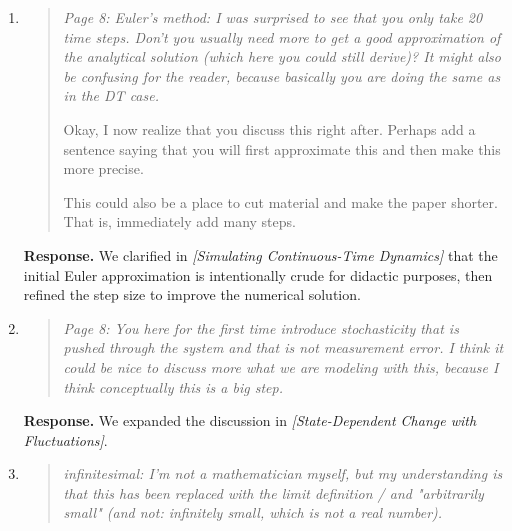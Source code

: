\documentclass[11pt]{article}
\newcommand{\response}{\textbf{Response.} }
\newcommand{\secit}[1]{\textit{[#1]}}
\newenvironment{reviewerpoint}{\begin{quote}\itshape}{\end{quote}}
\begin{document}
\begin{enumerate}[label=\textbf{Reviewer 1, Minor Point \arabic*.}]
\begin{reviewerpoint}
Page 8: When switching to the simulation, now the start of "Simulation" is very technical. Perhaps you could explain a bit more which problem you have to solve here and how you solve it with this numerical approximation.
\end{reviewerpoint}

\response We revised the opening of \secit{Simulating Continuous-Time Dynamics} to explain why numerical approximation is needed before presenting the Euler method.
\item

\begin{reviewerpoint}
Page 8: Euler's method: I was surprised to see that you only take 20 time steps.
Don't you usually need more to get a good approximation of the analytical solution (which here you could still derive)?
It might also be confusing for the reader, because basically you are doing the same as in the DT case.

Okay, I now realize that you discuss this right after.
Perhaps add a sentence saying that you will first approximate this and then make this more precise.

This could also be a place to cut material and make the paper shorter.
That is, immediately add many steps.
\end{reviewerpoint}

\response We clarified in \secit{Simulating Continuous-Time Dynamics} that the initial Euler approximation is intentionally crude for didactic purposes, then refined the step size to improve the numerical solution.
\item

\begin{reviewerpoint}
Page 8: You here for the first time introduce stochasticity that is pushed through the system and that is not measurement error.
I think it could be nice to discuss more what we are modeling with this, because I think conceptually this is a big step.
\end{reviewerpoint}

\response We expanded the discussion in \secit{State-Dependent Change with Fluctuations}.
\item

\begin{reviewerpoint}
infinitesimal: I'm not a mathematician myself, but my understanding is that this has been replaced with the limit definition / and "arbitrarily small" (and not: infinitely small, which is not a real number).
\end{reviewerpoint}


\end{enumerate}
\end{document}
